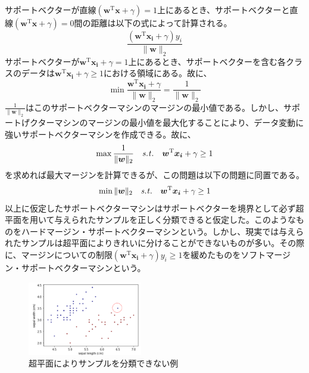 サポートベクターが直線$(\bm{w}^{\mathrm{T}}\bm{x} + \gamma) = 1$上にあるとき、サポートベクターと直線$(\bm{w}^{\mathrm{T}}\bm{x} + \gamma) = 0$間の距離は以下の式によって計算される。
\begin{equation}
  \frac{(\bm{w}^{\mathrm{T}}\bm{x_i} + \gamma)y_i}{\|\bm{w}\|_2}
\end{equation}
サポートベクターが$\bm{w}^{\mathrm{T}}\bm{x_i} + \gamma = 1$上にあるとき、サポートベクターを含む各クラスのデータは$\bm{w}^{\mathrm{T}}\bm{x_i} + \gamma \ge 1$における領域にある。故に、
\begin{equation}
  \min\frac{\bm{w}^{\mathrm{T}}\bm{x_i} + \gamma}{\|\bm{w}\|_2} = \frac{1}{\|\bm{w}\|_2}
\end{equation}
$\frac{1}{\|\bm{w}\|_2}$はこのサポートベクターマシンのマージンの最小値である。しかし、サポートげクターマシンのマージンの最小値を最大化することにより、データ変動に強いサポートベクターマシンを作成できる。故に、
\begin{equation}
  \max\frac{1}{\|\bm{w}\|_2}\text{\ \ \ }{\it{s.t.}}\text{\ \ \ }\bm{w}^{\mathrm{T}}\bm{x_i} + \gamma \ge 1
\end{equation}
を求めれば最大マージンを計算できるが、この問題は以下の問題に同置である。
\begin{equation}
  \min\|\bm{w}\|_2\text{\ \ \ }{\it{s.t.}}\text{\ \ \ }\bm{w}^{\mathrm{T}}\bm{x_i} + \gamma \ge 1
\end{equation}
以上に仮定したサポートベクターマシンはサポートベクターを境界として必ず超平面を用いて与えられたサンプルを正しく分類できると仮定した。このようなものをハードマージン・サポートベクターマシンという。しかし、現実では与えられたサンプルは超平面によりきれいに分けることができないものが多い。その際に、マージンについての制限$(\bm{w}^{\mathrm{T}}\bm{x_i} + \gamma)y_i \ge 1$を緩めたものをソフトマージン・サポートベクターマシンという。
\begin{figure}[h]
  \centering
  \includegraphics[width=5cm]{figure/section1/figure3.png}
  \caption{超平面によりサンプルを分類できない例}
\end{figure}
  



  




